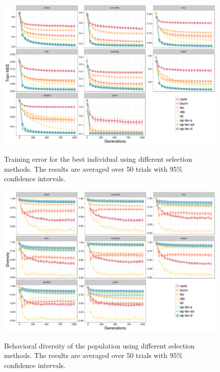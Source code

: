\documentclass[twoside]{article}
\begin{document}
\begin{figure}
\centering
  \includegraphics[width=\textwidth]{figs/regression_training_error.pdf}\\
 \caption{Training error for the best individual using different selection methods. The results are averaged over 50 trials with 95\% confidence intervals.}
\label{fig:train}
\end{figure}

\begin{figure}
\centering
  \includegraphics[width=\textwidth]{figs/regression_novelty.pdf}\\
 \caption{Behavioral diversity of the population using different selection methods. The results are averaged over 50 trials with 95\% confidence intervals.}
\label{fig:diversity}
\end{figure}
\end{document}
